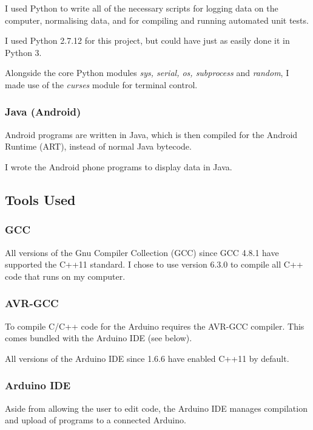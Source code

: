 \documentclass[a4paper]{article}
\begin{document}
I used Python\cite{ppref12} to write all of the necessary scripts for logging data on the computer, normalising data, and for compiling and running automated unit tests.

I used Python 2.7.12 for this project, but could have just as easily done it in Python 3.

Alongside the core Python modules \textit{sys, serial, os, subprocess} and \textit{random}, I made use of the \textit{curses}\cite{ppref13} module for terminal control.

\subsubsection{Java (Android)}

Android\cite{ppref14} programs are written in Java, which is then compiled for the Android Runtime (ART)\cite{ppref15}, instead of normal Java bytecode.

I wrote the Android phone programs to display data in Java.

\subsection{Tools Used}%
\label{subsec:pp_ts}

\subsubsection{GCC}

All versions of the Gnu Compiler Collection (GCC) since GCC 4.8.1 have supported the C++11 standard\cite{ppref16}. I chose to use version 6.3.0\cite{ppref17} to compile all C++ code that runs on my computer.

\subsubsection{AVR-GCC}

To compile C/C++ code for the Arduino requires the AVR-GCC compiler. This comes bundled with the Arduino IDE\cite{ppref18} (see below).

All versions of the Arduino IDE since 1.6.6 have enabled C++11 by default.

\subsubsection{Arduino IDE}

Aside from allowing the user to edit code, the Arduino IDE\cite{ppref18} manages compilation and upload of programs to a connected Arduino.
\end{document}
